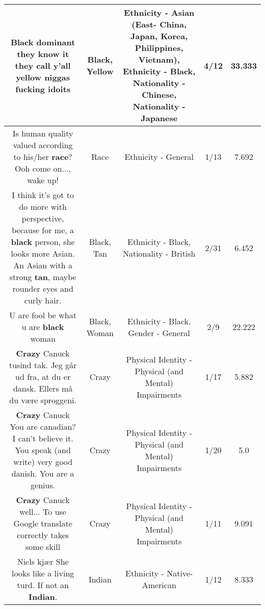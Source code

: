 \documentclass[11pt]{article}
\newlength\mylength
\begin{document}
\begin{center}
\begin{longtable}{|C{.65\mylength}|C{.30\mylength}|C{.12\mylength}|C{.12\mylength}|C{.12\mylength}|}
  \small Black dominant they know it they call y'all \textbf{y\textbf{e\textbf{llow}}} niggas fucking idoits\normalsize   & Black, Yellow & Ethnicity - Asian (East- China, Japan, Korea, Philippines, Vietnam), Ethnicity - Black, Nationality - Chinese, Nationality - Japanese & 4/12 & 33.333 \\  \hline
  \small Is human quality valued according to his/her \textbf{race}? Ooh come on..., wake up!\normalsize   & Race & Ethnicity - General & 1/13 & 7.692 \\  \hline
  \small I think it's got to do more with perspective, because for me, a \textbf{black} person, she looks more Asian. An Asian with a strong \textbf{tan}, maybe rounder eyes and curly hair.\normalsize   & Black, Tan & Ethnicity - Black, Nationality - British & 2/31 & 6.452 \\  \hline
  \small U are fool  be what u are  \textbf{black} woman\normalsize   & Black, Woman & Ethnicity - Black, Gender - General & 2/9 & 22.222 \\  \hline
  \small \@\textbf{Crazy} Canuck tusind tak. Jeg går ud fra, at du er dansk. Ellers må du være sproggeni.\normalsize   & Crazy & Physical Identity - Physical (and Mental) Impairments & 1/17 & 5.882 \\  \hline
  \small \@\textbf{Crazy} Canuck You are canadian? I can't believe it. You speak (and write) very good danish. You are a genius.\normalsize   & Crazy & Physical Identity - Physical (and Mental) Impairments & 1/20 & 5.0 \\  \hline
  \small \@\textbf{Crazy} Canuck well... To use Google translate correctly takes some skill\normalsize   & Crazy & Physical Identity - Physical (and Mental) Impairments & 1/11 & 9.091 \\  \hline
  \small Niels kjær She looks like a living turd. If not an \textbf{Indian}.\normalsize   & Indian & Ethnicity - Native-American & 1/12 & 8.333 \\  \hline

\end{longtable}
\end{center}
\end{document}
